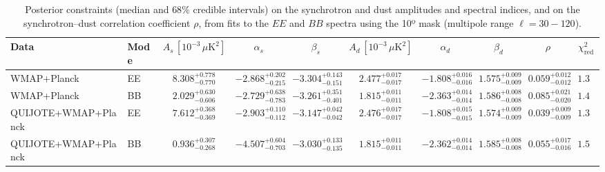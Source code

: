 \begin{table}[h]
\centering
\scriptsize
\setlength{\tabcolsep}{4pt}
\caption{Posterior constraints (median and $68\%$ credible intervals) on the synchrotron and dust amplitudes and spectral indices, and on the synchrotron--dust correlation coefficient $\rho$, from fits to the $EE$ and $BB$ spectra using the 10º mask (multipole range $\ell=30-120$).}
\label{tab:fit_all_pairs_ell30-120}
\begin{tabular}{llcccccccc}
\toprule
Data & Mode & $A_s\,[10^{-3}\,\mu\mathrm{K}^2]$ & $\alpha_s$ & $\beta_s$ & $A_d\,[10^{-3}\,\mu\mathrm{K}^2]$ & $\alpha_d$ & $\beta_d$ & $\rho$ & $\chi^2_\mathrm{red}$ \\
\midrule
WMAP+Planck & EE & $8.308^{+0.778}_{-0.770}$ & $-2.868^{+0.202}_{-0.215}$ & $-3.304^{+0.143}_{-0.151}$ & $2.477^{+0.017}_{-0.017}$ & $-1.808^{+0.016}_{-0.016}$ & $1.575^{+0.009}_{-0.009}$ & $0.059^{+0.012}_{-0.012}$ & $1.36$ \\
WMAP+Planck & BB & $2.029^{+0.630}_{-0.606}$ & $-2.729^{+0.638}_{-0.783}$ & $-3.261^{+0.351}_{-0.401}$ & $1.815^{+0.011}_{-0.011}$ & $-2.363^{+0.014}_{-0.014}$ & $1.586^{+0.008}_{-0.008}$ & $0.085^{+0.021}_{-0.020}$ & $1.49$ \\
QUIJOTE+WMAP+Planck & EE & $7.612^{+0.368}_{-0.369}$ & $-2.903^{+0.110}_{-0.112}$ & $-3.147^{+0.042}_{-0.042}$ & $2.476^{+0.017}_{-0.017}$ & $-1.808^{+0.015}_{-0.015}$ & $1.574^{+0.009}_{-0.009}$ & $0.039^{+0.009}_{-0.009}$ & $1.34$ \\
QUIJOTE+WMAP+Planck & BB & $0.936^{+0.307}_{-0.268}$ & $-4.507^{+0.604}_{-0.703}$ & $-3.030^{+0.133}_{-0.135}$ & $1.815^{+0.011}_{-0.011}$ & $-2.362^{+0.014}_{-0.014}$ & $1.585^{+0.008}_{-0.008}$ & $0.055^{+0.017}_{-0.016}$ & $1.51$ \\
\bottomrule
\end{tabular}
\end{table}